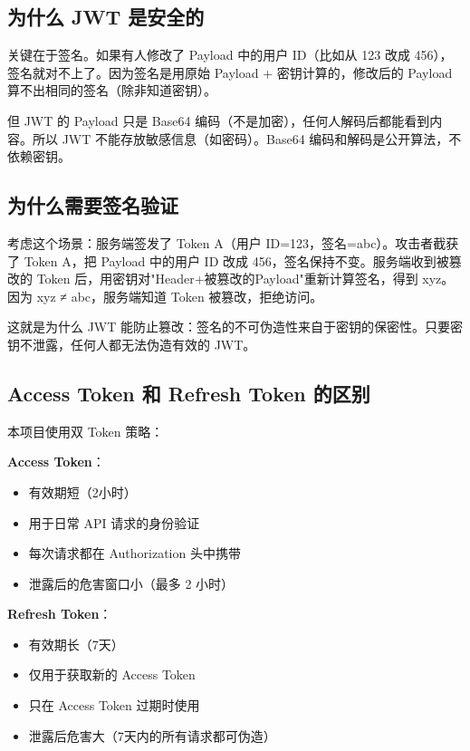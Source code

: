 \documentclass[12pt,a4paper]{ctexart}
\begin{document}
\subsection{为什么 JWT 是安全的}

关键在于签名。如果有人修改了 Payload 中的用户 ID（比如从 123 改成 456），签名就对不上了。因为签名是用原始 Payload + 密钥计算的，修改后的 Payload 算不出相同的签名（除非知道密钥）。

但 JWT 的 Payload 只是 Base64 编码（不是加密），任何人解码后都能看到内容。所以 JWT 不能存放敏感信息（如密码）。Base64 编码和解码是公开算法，不依赖密钥。

\subsection{为什么需要签名验证}

考虑这个场景：服务端签发了 Token A（用户 ID=123，签名=abc）。攻击者截获了 Token A，把 Payload 中的用户 ID 改成 456，签名保持不变。服务端收到被篡改的 Token 后，用密钥对"Header+被篡改的Payload"重新计算签名，得到 xyz。因为 xyz ≠ abc，服务端知道 Token 被篡改，拒绝访问。

这就是为什么 JWT 能防止篡改：签名的不可伪造性来自于密钥的保密性。只要密钥不泄露，任何人都无法伪造有效的 JWT。

\subsection{Access Token 和 Refresh Token 的区别}

本项目使用双 Token 策略：

\textbf{Access Token}：
\begin{itemize}
  \item 有效期短（2小时）
  \item 用于日常 API 请求的身份验证
  \item 每次请求都在 Authorization 头中携带
  \item 泄露后的危害窗口小（最多 2 小时）
\end{itemize}

\textbf{Refresh Token}：
\begin{itemize}
  \item 有效期长（7天）
  \item 仅用于获取新的 Access Token
  \item 只在 Access Token 过期时使用
  \item 泄露后危害大（7天内的所有请求都可伪造）
\end{itemize}
\end{document}
